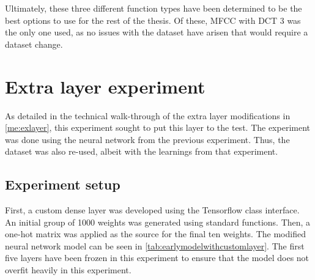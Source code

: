 Ultimately, these three different function types have been determined to be the best options to use for the rest of the thesis.
Of these, MFCC with DCT 3 was the only one used, as no issues with the dataset have arisen that would require a dataset change.


\section{Extra layer experiment}
\label{ex:layer}

As detailed in the technical walk-through of the extra layer modifications in \cref{me:exlayer}, this experiment sought to put this layer to the test.
The experiment was done using the neural network from the previous experiment.
Thus, the dataset was also re-used, albeit with the learnings from that experiment.

\subsection{Experiment setup}

First, a custom dense layer was developed using the Tensorflow class interface.
An initial group of 1000 weights was generated using standard functions.
Then, a one-hot matrix was applied as the source for the final ten weights.
The modified neural network model can be seen in \cref{tab:earlymodelwithcustomlayer}.
The first five layers have been frozen in this experiment to ensure that the model does not overfit heavily in this experiment.

